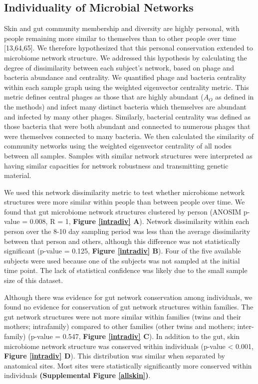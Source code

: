 \documentclass[12pt,]{article}
\begin{document}
\subsection{Individuality of Microbial
Networks}\label{individuality-of-microbial-networks}

Skin and gut community membership and diversity are highly personal,
with people remaining more similar to themselves than to other people
over time {[}13,64,65{]}. We therefore hypothesized that this personal
conservation extended to microbiome network structure. We addressed this
hypothesis by calculating the degree of dissimilarity between each
subject's network, based on phage and bacteria abundance and centrality.
We quantified phage and bacteria centrality within each sample graph
using the weighted eigenvector centrality metric. This metric defines
central phages as those that are highly abundant (\(A_{O}\) as defined
in the methods) and infect many distinct bacteria which themselves are
abundant and infected by many other phages. Similarly, bacterial
centrality was defined as those bacteria that were both abundant and
connected to numerous phages that were themselves connected to many
bacteria. We then calculated the similarity of community networks using
the weighted eigenvector centrality of all nodes between all samples.
Samples with similar network structures were interpreted as having
similar capacities for network robustness and transmitting genetic
material.

We used this network dissimilarity metric to test whether microbiome
network structures were more similar within people than between people
over time. We found that gut microbiome network structures clustered by
person (ANOSIM p-value = 0.008, R = 1, \textbf{Figure \ref{intradiv}
A}). Network dissimilarity within each person over the 8-10 day sampling
period was less than the average dissimilarity between that person and
others, although this difference was not statistically significant
(p-value = 0.125, \textbf{Figure \ref{intradiv} B}). Four of the five
available subjects were used because one of the subjects was not sampled
at the initial time point. The lack of statistical confidence was likely
due to the small sample size of this dataset.

Although there was evidence for gut network conservation among
individuals, we found no evidence for conservation of gut network
structures within families. The gut network structures were not more
similar within families (twins and their mothers; intrafamily) compared
to other families (other twins and mothers; inter-family) (p-value =
0.547, \textbf{Figure \ref{intradiv} C}). In addition to the gut, skin
microbiome network structure was conserved within individuals (p-value
\textless{} 0.001, \textbf{Figure \ref{intradiv} D}). This distribution
was similar when separated by anatomical sites. Most sites were
statistically significantly more conserved within individuals
\textbf{(Supplemental Figure \ref{allskin})}.
\end{document}
